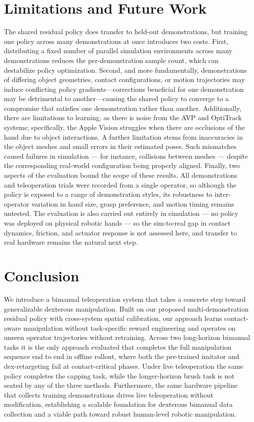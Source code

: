\section{Limitations and Future Work}

The shared residual policy does transfer to held-out demonstrations, but training one policy across many demonstrations at once introduces two costs. First, distributing a fixed number of parallel simulation environments across many demonstrations reduces the per-demonstration sample count, which can destabilize policy optimization. Second, and more fundamentally, demonstrations of differing object geometries, contact configurations, or motion trajectories may induce conflicting policy gradients—corrections beneficial for one demonstration may be detrimental to another—causing the shared policy to converge to a compromise that satisfies one demonstration rather than another. Additionally, there are limitations to learning, as there is noise from the AVP and OptiTrack systems; specifically, the Apple Vision struggles when there are occlusions of the hand due to object interactions. A further limitation stems from inaccuracies in the object meshes and small errors in their estimated poses. Such mismatches caused failures in simulation — for instance, collisions between meshes — despite the corresponding real-world configuration being properly aligned. Finally, two aspects of the evaluation bound the scope of these results. All demonstrations and teleoperation trials were recorded from a single operator, so although the policy is exposed to a range of demonstration styles, its robustness to inter-operator variation in hand size, grasp preference, and motion timing remains untested. The evaluation is also carried out entirely in simulation — no policy was deployed on physical robotic hands — so the sim-to-real gap in contact dynamics, friction, and actuator response is not assessed here, and transfer to real hardware remains the natural next step.

\section{Conclusion}

We introduce a bimanual teleoperation system that takes a concrete step toward generalizable dexterous manipulation. Built on our proposed multi-demonstration residual policy with cross-system spatial calibration, our approach learns contact-aware manipulation without task-specific reward engineering and operates on unseen operator trajectories without retraining. Across two long-horizon bimanual tasks it is the only approach evaluated that completes the full manipulation sequence end to end in offline rollout, where both the pre-trained imitator and dex-retargeting fail at contact-critical phases. Under live teleoperation the same policy completes the capping task, while the longer-horizon brush task is not seated by any of the three methods. Furthermore, the same hardware pipeline that collects training demonstrations drives live teleoperation without modification, establishing a scalable foundation for dexterous bimanual data collection and a viable path toward robust human-level robotic manipulation.


